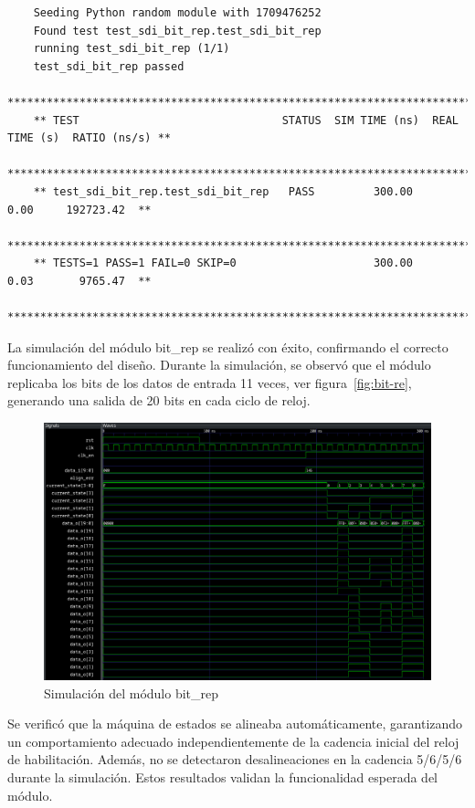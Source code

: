   {\scriptsize\begin{verbatim}
    Seeding Python random module with 1709476252
    Found test test_sdi_bit_rep.test_sdi_bit_rep
    running test_sdi_bit_rep (1/1)
    test_sdi_bit_rep passed
    *******************************************************************************************
    ** TEST                               STATUS  SIM TIME (ns)  REAL TIME (s)  RATIO (ns/s) **
    *******************************************************************************************
    ** test_sdi_bit_rep.test_sdi_bit_rep   PASS         300.00           0.00     192723.42  **
    *******************************************************************************************
    ** TESTS=1 PASS=1 FAIL=0 SKIP=0                     300.00           0.03       9765.47  **
    *******************************************************************************************
  \end{verbatim}}

  La simulación del módulo bit\_rep se realizó con éxito, confirmando el correcto
  funcionamiento del diseño. Durante la simulación, se observó que el módulo
  replicaba los bits de los datos de entrada 11 veces, ver figura~\ref{fig:bit-re},
  generando una salida de 20 bits en cada ciclo de reloj.

  \begin{figure}[h]
    \centering
    \includegraphics[width=1\textwidth]{./Figures/bit_rep.png}
    \caption{Simulación del módulo bit\_rep}\label{fig:bit-rep}
  \end{figure}
  
  Se verificó que la máquina de estados se alineaba automáticamente, garantizando
  un comportamiento adecuado independientemente de la cadencia inicial del reloj
  de habilitación. Además, no se detectaron desalineaciones en la cadencia 5/6/5/6
  durante la simulación. Estos resultados validan la funcionalidad esperada del
  módulo.

